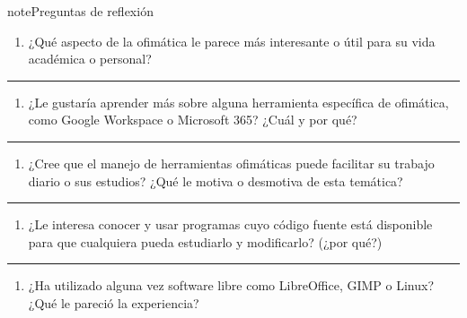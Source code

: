 \documentclass[letterpaper,10pt,spanish]{sphinxmanual}
\begin{document}
\begin{sphinxadmonition}{note}{Preguntas de reflexión}
\begin{enumerate}
%
\item {} 
\sphinxAtStartPar
¿Qué aspecto de la ofimática le parece más interesante o útil para su vida académica o personal?

\end{enumerate}


\bigskip\hrule\bigskip

\begin{enumerate}
%
\setcounter{enumi}{1}
\item {} 
\sphinxAtStartPar
¿Le gustaría aprender más sobre alguna herramienta específica de ofimática, como Google Workspace o Microsoft 365? ¿Cuál y por qué?

\end{enumerate}


\bigskip\hrule\bigskip

\begin{enumerate}
%
\setcounter{enumi}{2}
\item {} 
\sphinxAtStartPar
¿Cree que el manejo de herramientas ofimáticas puede facilitar su trabajo diario o sus estudios? ¿Qué le motiva o desmotiva de esta temática?

\end{enumerate}


\bigskip\hrule\bigskip

\begin{enumerate}
%
\setcounter{enumi}{3}
\item {} 
\sphinxAtStartPar
¿Le interesa conocer y usar programas cuyo código fuente está disponible para que cualquiera pueda estudiarlo y modificarlo? (¿por qué?)

\end{enumerate}


\bigskip\hrule\bigskip

\begin{enumerate}
%
\setcounter{enumi}{4}
\item {} 
\sphinxAtStartPar
¿Ha utilizado alguna vez software libre como LibreOffice, GIMP o Linux? ¿Qué le pareció la experiencia?

\end{enumerate}



\end{sphinxadmonition}
\end{document}
